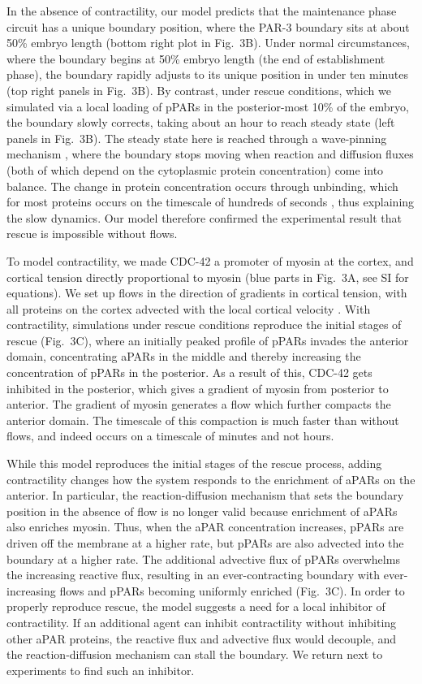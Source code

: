 \documentclass[11pt]{article}
\newcommand{\6}[1]{#1_{\text{6}}}
\newcommand{\3}[1]{#1_{\text{3}}}
\begin{document}
In the absence of contractility, our model predicts that the maintenance phase circuit has a unique boundary position, where the PAR-3 boundary sits at about 50\% embryo length (bottom right plot in Fig.\ 3B). Under normal circumstances, where the boundary begins at 50\% embryo length (the end of establishment phase), the boundary rapidly adjusts to its unique position in under ten minutes (top right panels in Fig.\ 3B). By contrast, under rescue conditions, which we simulated via a local loading of pPARs in the posterior-most 10\% of the embryo, the boundary slowly corrects, taking about an hour to reach steady state (left panels in Fig.\ 3B). The steady state here is reached through a wave-pinning mechanism \citep{mori2008wave, goehring2011polarization}, where the boundary stops moving when reaction and diffusion fluxes (both of which depend on the cytoplasmic protein concentration) come into balance. The change in protein concentration occurs through unbinding, which for most proteins occurs on the timescale of hundreds of seconds \citep{robin2014single}, thus explaining the slow dynamics. Our model therefore confirmed the experimental result that rescue is impossible without flows.

To model contractility, we made CDC-42 a promoter of myosin at the cortex, and cortical tension directly proportional to myosin (blue parts in Fig.\ 3A, see SI for equations). We set up flows in the direction of gradients in cortical tension, with all proteins on the cortex advected with the local cortical velocity \citep{illukkumbura2023design}. With contractility, simulations under rescue conditions reproduce the initial stages of rescue (Fig.\ 3C), where an initially peaked profile of pPARs invades the anterior domain, concentrating aPARs in the middle and thereby increasing the concentration of pPARs in the posterior. As a result of this, CDC-42 gets inhibited in the posterior, which gives a gradient of myosin from posterior to anterior. The gradient of myosin generates a flow which further compacts the anterior domain. The timescale of this compaction is much faster than without flows, and indeed occurs on a timescale of minutes and not hours.

While this model reproduces the initial stages of the rescue process, adding contractility changes how the system responds to the enrichment of aPARs on the anterior. In particular, the reaction-diffusion mechanism that sets the boundary position in the absence of flow is no longer valid because enrichment of aPARs also enriches myosin. Thus, when the aPAR concentration increases, pPARs are driven off the membrane at a higher rate, but pPARs are also advected into the boundary at a higher rate. The additional advective flux of pPARs overwhelms the increasing reactive flux, resulting in an ever-contracting boundary with ever-increasing flows and pPARs becoming uniformly enriched (Fig.\ 3C). In order to properly reproduce rescue, the model suggests a need for a local inhibitor of contractility. If an additional agent can inhibit contractility without inhibiting other aPAR proteins, the reactive flux and advective flux would decouple, and the reaction-diffusion mechanism can stall the boundary. We return next to experiments to find such an inhibitor.
\end{document}
